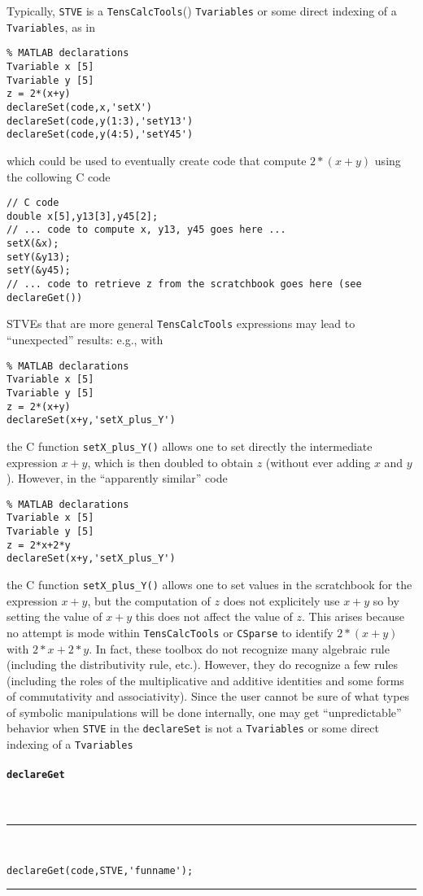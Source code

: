 \documentclass[11pt]{article}
\newcommand{\TC}{\texttt{TensCalcTools}}
\newcommand{\CS}{\texttt{CSparse}}
\newcommand{\codesize}{\footnotesize}
\newcommand{\toidx}[1]{\index{\lstinline{#1}}}%
\newenvironment{command}[1]{\toidx{#1}\addcontentsline{toc}{subsection}{\lstinline{#1}}\paragraph*{\lstinline[basicstyle=\large,columns={[l]flexible}]{#1}}~\\\noindent\rule{\textwidth}{2pt}\\\vspace{-3ex}\codesize}{\vspace{-3ex}\rule{\textwidth}{1pt}\medskip\noindent}
\begin{document}
Typically, \lstinline{STVE} is a \TC() \lstinline{Tvariables} or some
direct indexing of a \lstinline{Tvariables}, as in
\begin{lstlisting}
% MATLAB declarations 
Tvariable x [5]
Tvariable y [5]
z = 2*(x+y)
declareSet(code,x,'setX') 
declareSet(code,y(1:3),'setY13') 
declareSet(code,y(4:5),'setY45') 
\end{lstlisting}
  which could be used to eventually create code that compute
  $2*(x+y)$ using the collowing C code
\begin{lstlisting}
// C code
double x[5],y13[3],y45[2];
// ... code to compute x, y13, y45 goes here ...
setX(&x);
setY(&y13);
setY(&y45);
// ... code to retrieve z from the scratchbook goes here (see declareGet())
\end{lstlisting}
  STVEs that are more general \TC{} expressions may lead to
  ``unexpected'' results: e.g., with
\begin{lstlisting}
% MATLAB declarations 
Tvariable x [5]
Tvariable y [5]
z = 2*(x+y)
declareSet(x+y,'setX_plus_Y') 
\end{lstlisting}
  the C function \lstinline{setX_plus_Y()} allows one to set directly
  the intermediate expression $x+y$, which is then doubled to obtain
  $z$ (without ever adding $x$ and $y$). However, in the
  ``apparently similar'' code
\begin{lstlisting}
% MATLAB declarations 
Tvariable x [5]
Tvariable y [5]
z = 2*x+2*y
declareSet(x+y,'setX_plus_Y') 
\end{lstlisting}
  the C function \lstinline{setX_plus_Y()} allows one to set values in
  the scratchbook for the expression $x+y$, but the computation of $z$
  does not explicitely use $x+y$ so by setting the value of $x+y$ this
  does not affect the value of $z$. This arises because no attempt is
  mode within \TC{} or \CS{} to identify $2*(x+y)$ with $2*x+2*y$. In
  fact, these toolbox do not recognize many algebraic rule (including
  the distributivity rule, etc.). However, they do recognize a few
  rules (including the roles of the multiplicative and additive
  identities and some forms of commutativity and associativity). Since
  the user cannot be sure of what types of symbolic manipulations will
  be done internally, one may get ``unpredictable'' behavior when
  \lstinline{STVE} in the \lstinline{declareSet} is not a
  \lstinline{Tvariables} or some direct indexing of a
  \lstinline{Tvariables}

\begin{command}{declareGet}
\begin{lstlisting}
declareGet(code,STVE,'funname');
\end{lstlisting}
\end{command}
\end{document}
